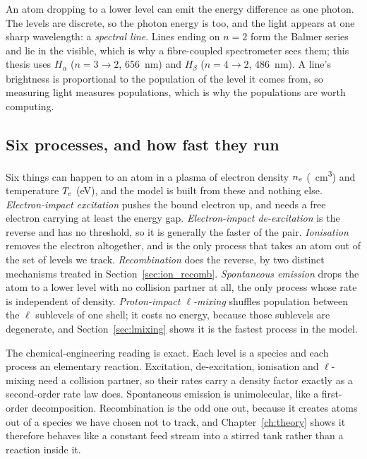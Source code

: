 An atom dropping to a lower level can emit the energy difference as one photon.
The levels are discrete, so the photon energy is too, and the light appears at
one sharp wavelength: a \emph{spectral line}. Lines ending on $n=2$ form the
Balmer series and lie in the visible, which is why a fibre-coupled spectrometer
sees them; this thesis uses $H_\alpha$ ($n=3\to2$, \SI{656}{\nano\metre}) and
$H_\beta$ ($n=4\to2$, \SI{486}{\nano\metre}). A line's brightness is
proportional to the population of the level it comes from, so measuring light
measures populations, which is why the populations are worth computing.

\subsection{Six processes, and how fast they run}

Six things can happen to an atom in a plasma of electron density $n_e$
(\si{\per\cubic\centi\metre}) and temperature $T_e$ (\si{\electronvolt}), and
the model is built from these and nothing else. \emph{Electron-impact
excitation} pushes the bound electron up, and needs a free electron carrying at
least the energy gap. \emph{Electron-impact de-excitation} is the reverse and
has no threshold, so it is generally the faster of the pair. \emph{Ionisation}
removes the electron altogether, and is the only process that takes an atom out
of the set of levels we track. \emph{Recombination} does the reverse, by two
distinct mechanisms treated in Section~\ref{sec:ion_recomb}.
\emph{Spontaneous emission} drops the atom to a lower level with no collision
partner at all, the only process whose rate is independent of density.
\emph{Proton-impact $\ell$-mixing} shuffles population between the $\ell$
sublevels of one shell; it costs no energy, because those sublevels are
degenerate, and Section~\ref{sec:lmixing} shows it is the fastest process in the
model.

The chemical-engineering reading is exact. Each level is a species and each
process an elementary reaction. Excitation, de-excitation, ionisation and
$\ell$-mixing need a collision partner, so their rates carry a density factor
exactly as a second-order rate law does. Spontaneous emission is unimolecular,
like a first-order decomposition. Recombination is the odd one out, because it
creates atoms out of a species we have chosen not to track, and
Chapter~\ref{ch:theory} shows it therefore behaves like a constant feed stream
into a stirred tank rather than a reaction inside it.

